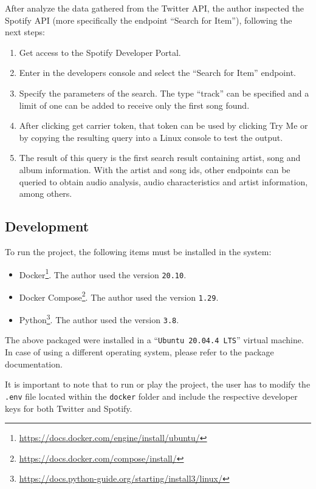 \nonzeroparskip After analyze the data gathered from the Twitter API,  the author inspected the Spotify API (more specifically the endpoint ``Search for Item''), following the next steps:
\begin{enumerate}
	\item Get access to the Spotify Developer Portal.
	\item Enter in the developers console and select the ``Search for Item'' endpoint.
	\item Specify the parameters of the search. The type ``track'' can be specified and a limit of one can be added to receive only the first song found.
	\item After clicking get carrier token, that token can be used by clicking Try Me or by copying the resulting query into a Linux console to test the output.
	\item The result of this query is the first search result containing artist, song and album information. With the artist and song ids, other endpoints can be queried to obtain audio analysis, audio characteristics and artist information, among others.
\end{enumerate}

\subsection{Development} \label{programmer_development}
\nonzeroparskip To run the project, the following items must be installed in the system:
\begin{itemize}
	\item Docker\footnote{\url{https://docs.docker.com/engine/install/ubuntu/}}. The author used the version \texttt{20.10}.
	\item Docker Compose\footnote{\url{https://docs.docker.com/compose/install/}}. The author used the version \texttt{1.29}.
	\item Python\footnote{\url{https://docs.python-guide.org/starting/install3/linux/}}. The author used the version \texttt{3.8}.
\end{itemize}

\nonzeroparskip The above packaged were installed in a ``\texttt{Ubuntu 20.04.4 LTS}'' virtual machine. In case of using a different operating system, please refer to the package documentation.

\nonzeroparskip It is important to note that to run or play the project, the user has to modify the \texttt{.env} file located within the \texttt{docker} folder and include the respective developer keys for both Twitter and Spotify.

